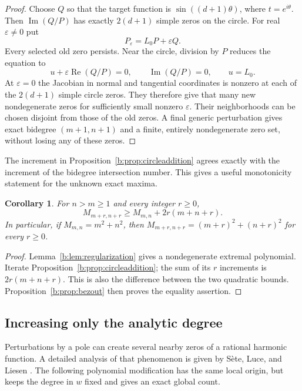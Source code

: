 \documentclass[UTF8,11pt]{ctexart}
\newtheorem{cor}[thm]{Corollary}
\theoremstyle{definition}
\numberwithin{equation}{section}
\newcommand{\eps}{\varepsilon}\newcommand{\ep}{\varepsilon}
\DeclareMathOperator{\Rea}{Re}\DeclareMathOperator{\Ima}{Im}
\begin{document}
\begin{proof}
Choose $Q$ so that the target function is
$\sin((d+1)\theta)$, where $t=e^{i\theta}$.
Then $\Ima(Q/P)$ has exactly $2(d+1)$ simple zeros on the circle.
For real $\eps\ne0$ put
\[
 P_\eps=L_0P+\eps Q.
\]
Every selected old zero persists. Near the circle, division by $P$
reduces the equation to
\[
 u+\eps\Rea(Q/P)=0,\qquad \Ima(Q/P)=0,
 \qquad u=L_0.
\]
At $\eps=0$ the Jacobian in normal and tangential coordinates is
nonzero at each of the $2(d+1)$ simple circle zeros. They therefore
give that many new nondegenerate zeros for sufficiently small
nonzero $\eps$. Their neighborhoods can be chosen disjoint from
those of the old zeros. A final generic perturbation gives exact
bidegree $(m+1,n+1)$ and a finite, entirely nondegenerate zero set,
without losing any of these zeros.
\end{proof}

The increment in Proposition~\ref{b:prop:circleaddition} agrees exactly
with the increment of the bidegree intersection number. This gives a
useful monotonicity statement for the unknown exact maxima.
\begin{cor}\label{b:cor:diagonal}
For $n>m\ge1$ and every integer $r\ge0$,
\[
 M_{m+r,n+r}\ge M_{m,n}+2r(m+n+r).
\]
In particular, if $M_{m,n}=m^2+n^2$, then
$M_{m+r,n+r}=(m+r)^2+(n+r)^2$ for every $r\ge0$.
\end{cor}
\begin{proof}
Lemma~\ref{b:lem:regularization} gives a nondegenerate extremal
polynomial. Iterate Proposition~\ref{b:prop:circleaddition}; the sum
of its $r$ increments is $2r(m+n+r)$. This is also the difference
between the two quadratic bounds. Proposition~\ref{b:prop:bezout}
then proves the equality assertion.
\end{proof}

\subsection{Increasing only the analytic degree}
Perturbations by a pole can create several nearby zeros of a rational
harmonic function. A detailed analysis of that phenomenon is given by
S\`ete, Luce, and Liesen \cite[Theorem~3.1, \av, p.~7]{SLL15}.
The following polynomial modification has the same local origin, but
keeps the degree in $w$ fixed and gives an exact global count.
\end{document}
